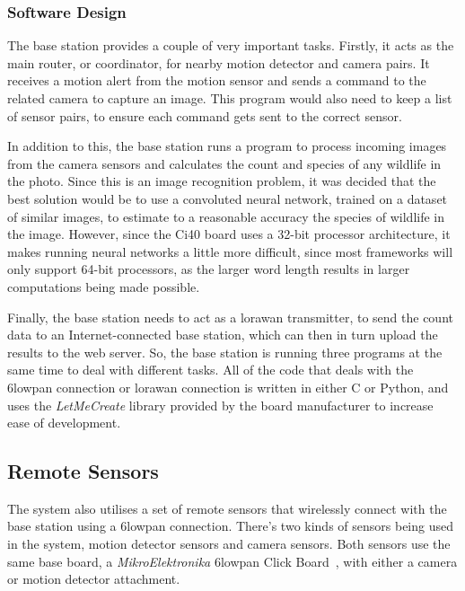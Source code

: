 \subsubsection{Software Design}
The base station provides a couple of very important tasks. Firstly, it acts
as the main router, or coordinator, for nearby motion detector and camera
pairs. It receives a motion alert from the motion sensor and sends a command
to the related camera to capture an image. This program would also need to
keep a list of sensor pairs, to ensure each command gets sent to the correct
sensor.

In addition to this, the base station runs a program to process incoming
images from the camera sensors and calculates the count and species of any
wildlife in the photo. Since this is an image recognition problem, it was
decided that the best solution would be to use a convoluted neural network,
trained on a dataset of similar images, to estimate to a reasonable accuracy
the species of wildlife in the image. However, since the Ci40 board uses a
32-bit processor architecture, it makes running neural networks a little more
difficult, since most frameworks will only support 64-bit processors, as the
larger word length results in larger computations being made possible.

Finally, the base station needs to act as a \gls{lorawan} transmitter, to
send the count data to an Internet-connected base station, which can then in
turn upload the results to the web server. So, the base station is running
three programs at the same time to deal with different tasks. All of the code
that deals with the \gls{6lowpan} connection or \gls{lorawan} connection is
written in either C or Python, and uses the \textit{LetMeCreate} library
provided by the board manufacturer to increase ease of development.

\subsection{Remote Sensors}


The system also utilises a set of remote sensors that wirelessly connect with
the base station using a \gls{6lowpan} connection. There's two kinds of
sensors being used in the system, motion detector sensors and camera sensors.
Both sensors use the same base board, a \textit{MikroElektronika}
\gls{6lowpan} Click Board~\cite{mikroeclick}, with either a camera or motion
detector attachment.

